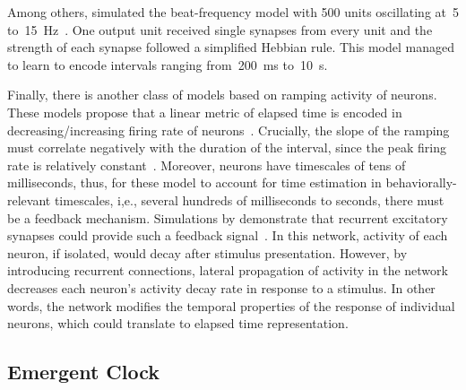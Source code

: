 Among others,  simulated the beat-frequency model with 500 units oscillating at~5 to~15~Hz~\cite{Miali1989NeuComp}.
One output unit received single synapses from every unit and the strength of each synapse followed a simplified Hebbian rule.
This model managed to learn to encode intervals ranging from~200~ms to~10~s.
\par
Finally, there is another class of models based on ramping activity of neurons.
These models propose that a linear metric of elapsed time is encoded in decreasing/increasing firing rate of neurons~\cite{Paton2018NeuronRev}.
Crucially, the slope of the ramping must correlate negatively with the duration of the interval, since the peak firing rate is relatively constant~\cite{Jazayeri2015CurrBiol}.
Moreover, neurons have timescales of tens of milliseconds, thus, for these model to account for time estimation in behaviorally-relevant timescales, i,e., several hundreds of milliseconds to seconds, there must be a feedback mechanism.
Simulations by \citeauthor{Gavornik20009PNAS} demonstrate that recurrent excitatory synapses could provide such a feedback signal~\cite{Gavornik20009PNAS}.
In this network, activity of each neuron, if isolated, would decay after stimulus presentation.
However, by introducing recurrent connections, lateral propagation of activity in the network decreases each neuron's activity decay rate in response to a stimulus.
In other words, the network modifies the temporal properties of the response of individual neurons, which could translate to elapsed time representation.

\subsection{Emergent Clock}
\label{ch:intro:InternalTimeEstimation:Emergent}

